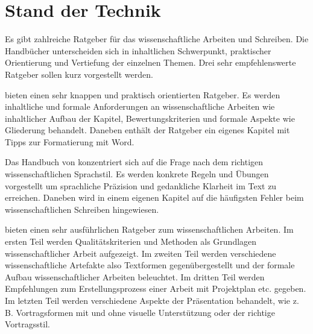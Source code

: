 \section{Stand der Technik}\label{sec:stand_der_technik}

Es gibt zahlreiche Ratgeber für das wissenschaftliche Arbeiten und Schreiben. Die Handbücher unterscheiden sich in inhaltlichen Schwerpunkt, praktischer Orientierung und Vertiefung der einzelnen Themen. Drei sehr empfehlenswerte Ratgeber sollen kurz vorgestellt werden.

\cite{karmasin2012gestaltung} bieten einen sehr knappen und praktisch orientierten Ratgeber. Es werden inhaltliche und formale Anforderungen an wissenschaftliche Arbeiten wie inhaltlicher Aufbau der Kapitel, Bewertungskriterien und formale Aspekte wie Gliederung behandelt. Daneben enthält der Ratgeber ein eigenes Kapitel mit Tipps zur Formatierung mit Word.

Das Handbuch von \cite{esselborn2012richtig} konzentriert sich auf die Frage nach dem richtigen wissenschaftlichen Sprachstil. Es werden konkrete Regeln und Übungen vorgestellt um sprachliche Präzision und gedankliche Klarheit im Text zu erreichen. Daneben wird in einem eigenen Kapitel auf die häufigsten Fehler beim wissenschaftlichen Schreiben hingewiesen.

\cite{balzert2011wissenschaftliches} bieten einen sehr ausführlichen Ratgeber zum wissenschaftlichen Arbeiten. Im ersten Teil werden Qualitätskriterien und Methoden als Grundlagen wissenschaftlicher Arbeit aufgezeigt. Im zweiten Teil werden verschiedene wissenschaftliche Artefakte also Textformen gegenübergestellt und der formale Aufbau wissenschaftlicher Arbeiten beleuchtet. Im dritten Teil werden Empfehlungen zum Erstellungsprozess einer Arbeit mit Projektplan etc. gegeben. Im letzten Teil werden verschiedene Aspekte der Präsentation behandelt, wie z. B. Vortragsformen mit und ohne visuelle Unterstützung oder der richtige Vortragsstil.
